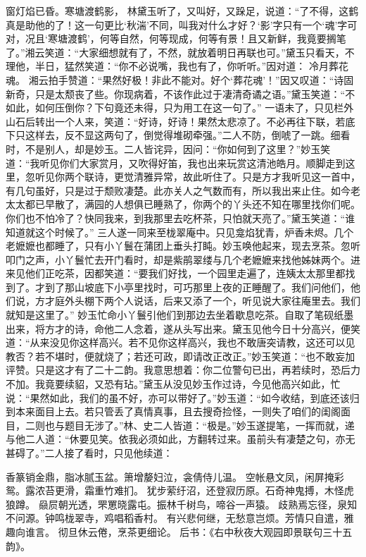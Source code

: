 \documentclass[12pt,oneside]{book}
\begin{document}
窗灯焰已昏。寒塘渡鹤影，
林黛玉听了，又叫好，又跺足，说道：“了不得，这鹤真是助他的了！这一句更比‘秋湍’不同，叫我对什么才好？‘影’字只有一个‘魂’字可对，况且‘寒塘渡鹤’，何等自然，何等现成，何等有景！且又新鲜，我竟要搁笔了。”湘云笑道：“大家细想就有了，不然，就放着明日再联也可。”黛玉只看天，不理他，半日，猛然笑道：“你不必说嘴，我也有了，你听听。”因对道：
冷月葬花魂。
湘云拍手赞道：“果然好极！非此不能对。好个‘葬花魂’！”因又叹道：“诗固新奇，只是太颓丧了些。你现病着，不该作此过于凄清奇谲之语。”黛玉笑道：“不如此，如何压倒你？下句竟还未得，只为用工在这一句了。”
一语未了，只见栏外山石后转出一个人来，笑道：“好诗，好诗！果然太悲凉了。不必再往下联，若底下只这样去，反不显这两句了，倒觉得堆砌牵强。”二人不防，倒唬了一跳。细看时，不是别人，却是妙玉。二人皆诧异，因问：“你如何到了这里？”妙玉笑道：“我听见你们大家赏月，又吹得好笛，我也出来玩赏这清池皓月。顺脚走到这里，忽听见你两个联诗，更觉清雅异常，故此听住了。只是方才我听见这一首中，有几句虽好，只是过于颓败凄楚。此亦关人之气数而有，所以我出来止住。如今老太太都已早散了，满园的人想俱已睡熟了，你两个的丫头还不知在哪里找你们呢。你们也不怕冷了？快同我来，到我那里去吃杯茶，只怕就天亮了。”黛玉笑道：“谁知道就这个时候了。”
三人遂一同来至栊翠庵中。只见龛焰犹青，炉香未烬。几个老嬷嬷也都睡了，只有小丫鬟在蒲团上垂头打盹。妙玉唤他起来，现去烹茶。忽听叩门之声，小丫鬟忙去开门看时，却是紫鹃翠缕与几个老嬷嬷来找他姊妹两个。进来见他们正吃茶，因都笑道：“要我们好找，一个园里走遍了，连姨太太那里都找到了。才到了那山坡底下小亭里找时，可巧那里上夜的正睡醒了。我们问他们，他们说，方才庭外头棚下两个人说话，后来又添了一个，听见说大家往庵里去。我们就知是这里了。”
妙玉忙命小丫鬟引他们到那边去坐着歇息吃茶。自取了笔砚纸墨出来，将方才的诗，命他二人念着，遂从头写出来。黛玉见他今日十分高兴，便笑道：“从来没见你这样高兴。若不见你这样高兴，我也不敢唐突请教，这还可以见教否？若不堪时，便就烧了；若还可政，即请改正改正。”妙玉笑道：“也不敢妄加评赞。只是这才有了二十二韵。我意思想着：你二位警句已出，再若续时，恐后力不加。我竟要续貂，又恐有玷。”黛玉从没见妙玉作过诗，今见他高兴如此，忙说：“果然如此，我们的虽不好，亦可以带好了。”妙玉道：“如今收结，到底还该归到本来面目上去。若只管丢了真情真事，且去搜奇捡怪，一则失了咱们的闺阁面目，二则也与题目无涉了。”林、史二人皆道：“极是。”妙玉遂提笔，一挥而就，递与他二人道：“休要见笑。依我必须如此，方翻转过来。虽前头有凄楚之句，亦无甚碍了。”二人接了看时，只见他续道：

香篆销金鼎，脂冰腻玉盆。箫增嫠妇泣，衾倩侍儿温。
空帐悬文凤，闲屏掩彩鸳。露浓苔更滑，霜重竹难扪。
犹步萦纡沼，还登寂历原。石奇神鬼搏，木怪虎狼蹲。
赑屃朝光透，罘罳晓露屯。振林千树鸟，啼谷一声猿。
歧熟焉忘径，泉知不问源。钟鸣栊翠寺，鸡唱稻香村。
有兴悲何继，无愁意岂烦。芳情只自遣，雅趣向谁言。
彻旦休云倦，烹茶更细论。
后书：《右中秋夜大观园即景联句三十五韵》。
\end{document}
